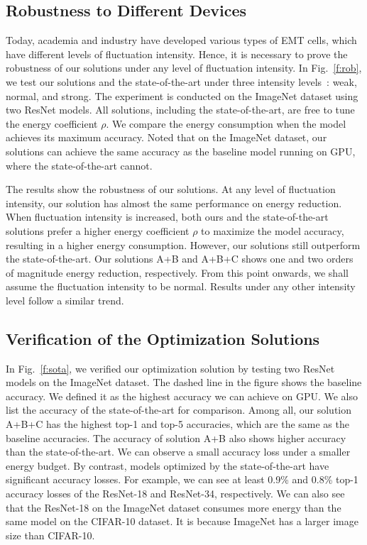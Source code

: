 \documentclass[10pt,journal,compsoc]{IEEEtran}
\begin{document}
\subsection{Robustness to Different Devices}

Today, academia and industry have developed various types of  EMT cells, which have different levels of fluctuation intensity. Hence, it is necessary to prove the robustness of our solutions under any level of fluctuation intensity. In Fig.~\ref{f:rob}, we test our solutions and the state-of-the-art under three intensity levels~\cite{raghavan2013microscopic}:  weak,  normal, and strong. The experiment is conducted on the ImageNet dataset using two ResNet models. All solutions, including the state-of-the-art, are free to tune the energy coefficient $\rho$. We compare the energy consumption when the model achieves its maximum accuracy. Noted that on the ImageNet dataset, our solutions can achieve the same accuracy as the baseline model running on GPU, where the state-of-the-art cannot.

The results show the robustness of our solutions. At any level of fluctuation intensity, our solution has almost the same performance on energy reduction. When fluctuation intensity is increased, both ours and the state-of-the-art solutions prefer a higher energy coefficient $\rho$ to maximize the model accuracy, resulting in a higher energy consumption. However, our solutions still outperform the state-of-the-art. Our solutions A+B and A+B+C shows one and two orders of magnitude energy reduction, respectively. From this point onwards, we shall assume the fluctuation intensity to be normal. Results under any other intensity level follow a similar trend.



\subsection{Verification of the Optimization Solutions}

In Fig.~\ref{f:sota}, we verified our optimization solution by testing two ResNet models on the ImageNet dataset. The dashed line in the figure shows the baseline accuracy. We defined it as the highest accuracy we can achieve on GPU. We also list the accuracy of the state-of-the-art for comparison. Among all, our solution A+B+C has the highest top-1 and top-5 accuracies, which are the same as the baseline accuracies. The accuracy of solution A+B also shows higher accuracy than the state-of-the-art. We can observe a small accuracy loss under a smaller energy budget. By contrast, models optimized by the state-of-the-art have significant accuracy losses. For example, we can see at least 0.9\% and 0.8\% top-1 accuracy losses of the ResNet-18 and ResNet-34, respectively. We can also see that the ResNet-18 on the ImageNet dataset consumes more energy than the same model on the CIFAR-10 dataset. It is because ImageNet has a larger image size than CIFAR-10.
\end{document}

